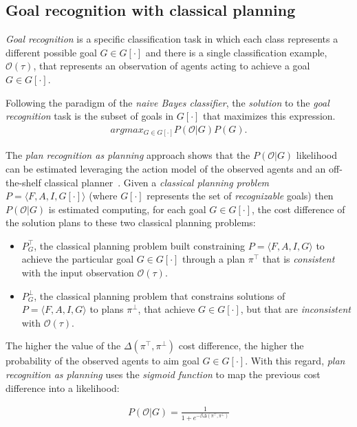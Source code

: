 \documentclass[letterpaper]{article} %
\newcommand{\tup}[1]{{\langle #1 \rangle}}
\begin{document}
\subsection{Goal recognition with classical planning}
{\em Goal recognition} is a specific classification task in which each class represents a different possible goal $G\in G[\cdot]$ and there is a single classification example, $\mathcal{O}(\tau)$, that represents an observation of agents acting to achieve a goal $G\in G[\cdot]$.

Following the paradigm of the {\em naive Bayes classifier}, the {\em solution} to the {\em goal recognition} task is the subset of goals in $G[\cdot]$ that maximizes this expression.
\begin{align}
argmax_{G\in G[\cdot]} P(\mathcal{O}|G) P(G).
\end{align}

The {\em plan recognition as planning} approach shows that the $P(\mathcal{O}|G)$ likelihood can be estimated leveraging the action model of the observed agents and an off-the-shelf classical planner~\cite{ramirez2012plan}. Given a {\em classical planning problem} $P=\tup{F,A,I,G[\cdot]}$ (where $G[\cdot]$ represents the set of {\em recognizable} goals) then $P(\mathcal{O}|G)$ is estimated computing, for each goal $G\in G[\cdot]$, the cost difference of the solution plans to these two classical planning problems:
\begin{itemize}
\item $P^{\top}_G$, the classical planning problem built constraining $P=\tup{F,A,I,G}$ to achieve the particular goal $G\in G[\cdot]$ through a plan $\pi^\top$ that is {\em consistent} with the input observation $\mathcal{O}(\tau)$.
\item $P^{\bot}_G$, the classical planning problem that constrains solutions of $P=\tup{F,A,I,G}$ to plans $\pi^\bot$, that achieve $G\in G[\cdot]$, but that are {\em inconsistent} with $\mathcal{O}(\tau)$.
\end{itemize}

The higher the value of the $\Delta(\pi^\top,\pi^\bot)$ cost difference, the higher the probability of the observed agents to aim goal $G\in G[\cdot]$. With this regard, {\em plan recognition as planning} uses the {\em sigmoid function} to map the previous cost difference into a likelihood:

\begin{align}
P(\mathcal{O}|G) = \frac{1}{1+e^{-\beta \Delta(\pi^\top,\pi^\bot)}}
\end{align}
\end{document}
